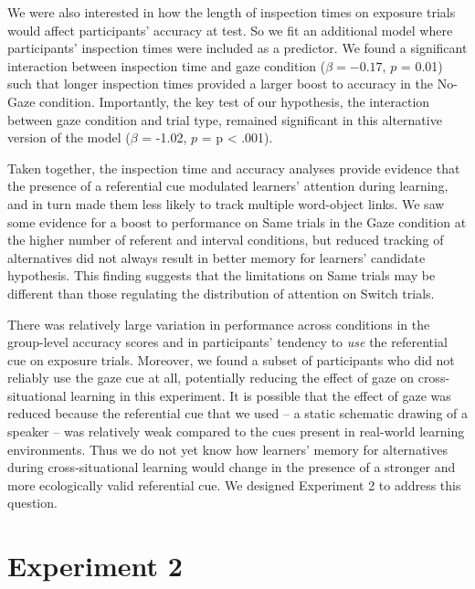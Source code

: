 \documentclass[authoryear, review]{elsarticle}
\begin{document}
We were also interested in how the length of inspection times on
exposure trials would affect participants' accuracy at test. So we fit
an additional model where participants' inspection times were included
as a predictor. We found a significant interaction between inspection
time and gaze condition (\(\beta = -0.17\), \(p\) = 0.01) such that
longer inspection times provided a larger boost to accuracy in the
No-Gaze condition. Importantly, the key test of our hypothesis, the
interaction between gaze condition and trial type, remained significant
in this alternative version of the model (\(\beta\) = -1.02, \(p\) = p
\textless{} .001).

Taken together, the inspection time and accuracy analyses provide
evidence that the presence of a referential cue modulated learners'
attention during learning, and in turn made them less likely to track
multiple word-object links. We saw some evidence for a boost to
performance on Same trials in the Gaze condition at the higher number of
referent and interval conditions, but reduced tracking of alternatives
did not always result in better memory for learners' candidate
hypothesis. This finding suggests that the limitations on Same trials
may be different than those regulating the distribution of attention on
Switch trials.

There was relatively large variation in performance across conditions in
the group-level accuracy scores and in participants' tendency to
\emph{use} the referential cue on exposure trials. Moreover, we found a
subset of participants who did not reliably use the gaze cue at all,
potentially reducing the effect of gaze on cross-situational learning in
this experiment. It is possible that the effect of gaze was reduced
because the referential cue that we used -- a static schematic drawing
of a speaker -- was relatively weak compared to the cues present in
real-world learning environments. Thus we do not yet know how learners'
memory for alternatives during cross-situational learning would change
in the presence of a stronger and more ecologically valid referential
cue. We designed Experiment 2 to address this question.

\section{Experiment 2}\label{experiment-2}
\end{document}

